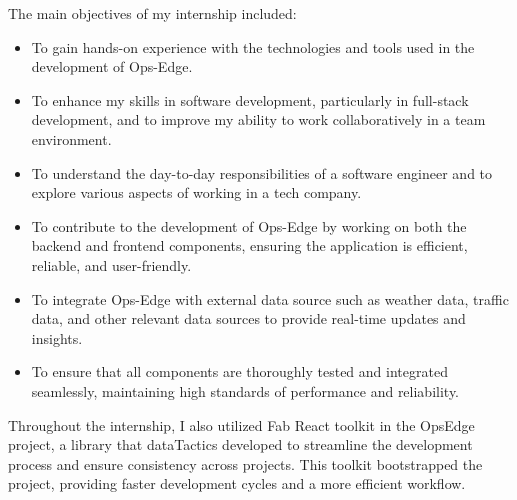 The main objectives of my internship included:

\begin{itemize}
    \item To gain hands-on experience with the technologies and tools used in the development of Ops-Edge.
    \item To enhance my skills in software development, particularly in full-stack development, and to improve my ability to work collaboratively in a team environment.
    \item To understand the day-to-day responsibilities of a software engineer and to explore various aspects of working in a tech company.
    \item To contribute to the development of Ops-Edge by working on both the backend and frontend components, ensuring the application is efficient, reliable, and user-friendly.
    \item To integrate Ops-Edge with external data source such as weather data, traffic data, and other relevant data sources to provide real-time updates and insights.
    \item To ensure that all components are thoroughly tested and integrated seamlessly, maintaining high standards of performance and reliability.
\end{itemize}

Throughout the internship, I also utilized Fab React toolkit in the OpsEdge project, a library that dataTactics developed to streamline the development process and ensure consistency across projects. This toolkit bootstrapped the project, providing faster development cycles and a more efficient workflow.